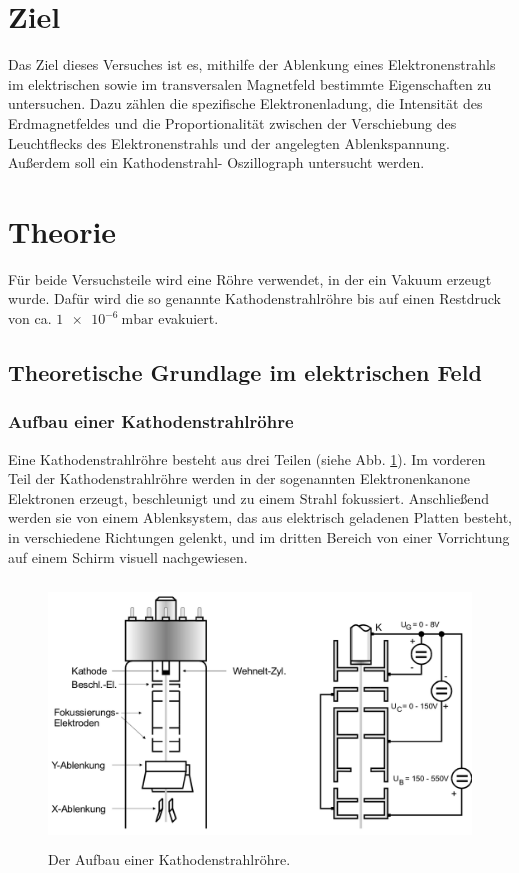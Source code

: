 \section{Ziel}
Das Ziel dieses Versuches ist es, mithilfe der Ablenkung
eines Elektronenstrahls im elektrischen sowie im transversalen
Magnetfeld bestimmte Eigenschaften zu untersuchen.
Dazu zählen die spezifische Elektronenladung, die Intensität
des Erdmagnetfeldes und die Proportionalität zwischen der
Verschiebung des Leuchtflecks des Elektronenstrahls und der
angelegten Ablenkspannung. Außerdem soll ein Kathodenstrahl-
Oszillograph untersucht werden.

\section{Theorie}
\label{sec:Theorie}
Für beide Versuchsteile wird eine Röhre verwendet, in der ein
Vakuum erzeugt wurde. Dafür wird die so genannte Kathodenstrahlröhre 
bis auf einen Restdruck von ca. $\SI{1e-6}{\milli\bar}$
evakuiert. 

\subsection{Theoretische Grundlage im elektrischen Feld}

\subsubsection{Aufbau einer Kathodenstrahlröhre}
Eine Kathodenstrahlröhre besteht aus drei 
Teilen (siehe Abb. \ref{fig:roehre}). Im vorderen Teil der Kathodenstrahlröhre  werden in der sogenannten Elektronenkanone Elektronen erzeugt, beschleunigt und zu einem Strahl fokussiert. 
Anschließend werden sie von einem Ablenksystem, das aus elektrisch geladenen Platten besteht, in verschiedene Richtungen gelenkt, und im dritten Bereich von einer Vorrichtung auf einem Schirm visuell nachgewiesen. 
\begin{figure}
    \centering
    \includegraphics[width=12cm, height=7cm]{build/roehre.png}
    \caption{Der Aufbau einer Kathodenstrahlröhre. \cite{V501}}
    \label{fig:roehre}
\end{figure}

